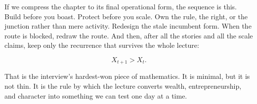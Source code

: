 If we compress the chapter to its final operational form, the sequence is this. Build before you boast. Protect before you scale. Own the rule, the right, or the junction rather than mere activity. Redesign the stale incumbent form. When the route is blocked, redraw the route. And then, after all the stories and all the scale claims, keep only the recurrence that survives the whole lecture:

\begin{equation}
X_{t+1} > X_t.
\end{equation}

That is the interview's hardest-won piece of mathematics. It is minimal, but it is not thin. It is the rule by which the lecture converts wealth, entrepreneurship, and character into something we can test one day at a time.